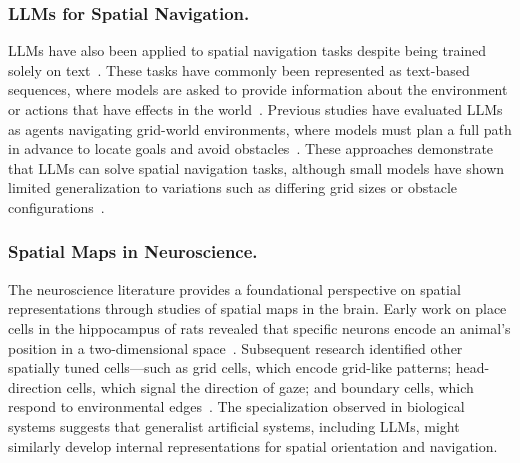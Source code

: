 \subsubsection{LLMs for Spatial Navigation.} LLMs have also been applied to spatial navigation tasks despite being trained solely on text~\cite{Cote2019,Huang2022}. These tasks have commonly been represented as text-based sequences, where models are asked to provide information about the environment or actions that have effects in the world~\cite{Zhu2023,Yamada2023,Lin2023}. Previous studies have evaluated LLMs as agents navigating grid-world environments, where models must plan a full path in advance to locate goals and avoid obstacles~\cite{Aghzal2023,McDonald2023}. These approaches demonstrate that LLMs can solve spatial navigation tasks, although small models have shown limited generalization to variations such as differing grid sizes or obstacle configurations~\cite{Aghzal2023}.

\subsubsection{Spatial Maps in Neuroscience.} The neuroscience literature provides a foundational perspective on spatial representations through studies of spatial maps in the brain. Early work on place cells in the hippocampus of rats revealed that specific neurons encode an animal’s position in a two-dimensional space~\cite{OKeefeDostrovsky1971,OKeefe1976}. Subsequent research identified other spatially tuned cells—such as grid cells, which encode grid-like patterns; head-direction cells, which signal the direction of gaze; and boundary cells, which respond to environmental edges~\cite{Hafting2005,Lever2009,Taube1990}. The specialization observed in biological systems suggests that generalist artificial systems, including LLMs, might similarly develop internal representations for spatial orientation and navigation.